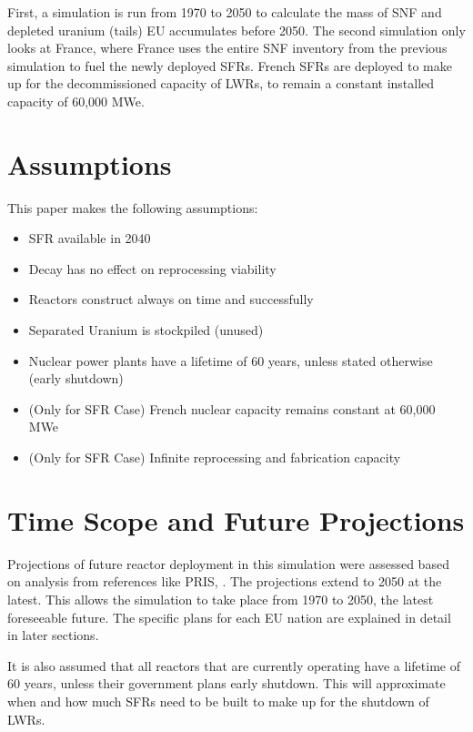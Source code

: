 First, a simulation is run from 1970 to 2050 to calculate the mass of 
\gls{SNF} and depleted uranium (tails) EU accumulates before 2050. 
The second simulation only looks at France, where France
uses the entire \gls{SNF} inventory from the previous
simulation to fuel
the newly deployed \glspl{SFR}. French \gls{SFR}s are deployed
to make up for the decommissioned capacity of \gls{LWR}s, to
remain a constant installed capacity of 60,000 MWe.

\section{Assumptions}
This paper makes the following assumptions:
\begin{itemize}
	\item SFR available in 2040
	\item Decay has no effect on reprocessing viability
	\item Reactors construct always on time and successfully
	\item Separated Uranium is stockpiled (unused)
	\item Nuclear power plants have a lifetime of 60 years, unless stated otherwise (early shutdown)
	\item (Only for SFR Case) French nuclear capacity remains constant at 60,000 MWe
	\item (Only for SFR Case) Infinite reprocessing and fabrication capacity
\end{itemize}


\section{Time Scope and Future Projections}
Projections of future reactor deployment in this simulation were
assessed based on analysis from references like \gls{PRIS},
\cite{world_nuclear_association_nuclear_2017} \cite{joskow_future_2012} \cite{hatch_politics_2015}.
The projections extend to 2050 at the latest. This allows the simulation to take place from
1970 to 2050, the latest foreseeable future. The specific plans for each EU nation are explained
in detail in later sections.

It is also assumed that all reactors that are 
currently operating have a lifetime of 60 years, unless their government plans
early shutdown. This will approximate when and how much \glspl{SFR} need to be built
to make up for the shutdown of \glspl{LWR}.


